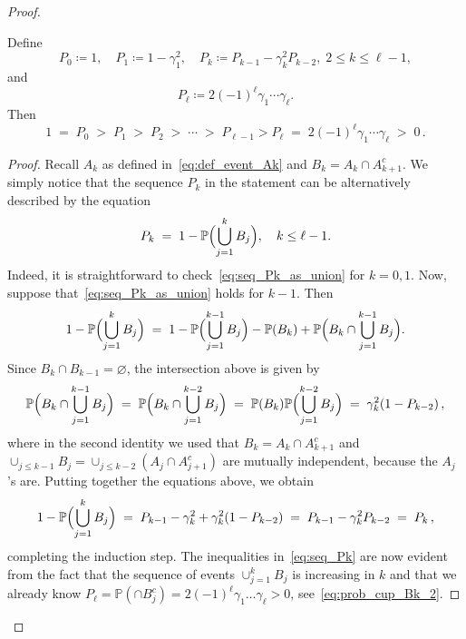 \documentclass[10pt,a4paper]{amsart}
\newcommand{\bb}[1]{{\mathbb #1}}
\begin{document}
\begin{proof}
\begin{lemma}
\label{lema:seq_Pk}
Define 
$$P_0 \coloneqq 1,\quad  P_1\coloneqq 1 - \gamma^2_1,\quad  P_k \coloneqq P_{k-1} - \gamma_k^2
P_{k-2}, \; 2\leq k\leq \ell-1,$$
%
and
%
$$P_\ell\coloneqq 2(-1)^\ell \gamma_1\cdots \gamma_\ell.
$$ 
%
Then
\begin{equation}
\label{eq:seq_Pk}
1    \;=\; P_0 \;>\; P_1 \;>\; P_2 \;>\; \cdots \;>\; P_{\ell-1} > P_{\ell}
    \;=\; 2(-1)^{\ell} \gamma_1 \cdots \gamma_\ell
    \;>\;0\,.
\end{equation}
\end{lemma}

\begin{proof}
Recall $A_k$ as defined in~\eqref{eq:def_event_Ak} and $B_k = A_k \cap
A_{k+1}^c$. We simply notice that the sequence $P_k$ in the statement can be
alternatively described by the equation
\begin{equation}\label{eq:seq_Pk_as_union}
    P_k \;=\; 1 - \bb P \Bigl(\bigcup_{j=1}^k B_j\Bigr),\quad k\leq \ell-1.
\end{equation}
Indeed, it is straightforward to check~\eqref{eq:seq_Pk_as_union} for $k=0,1$.
Now, suppose that~\eqref{eq:seq_Pk_as_union} holds for $k-1$. Then
\begin{align*}
1 - \bb P\Bigl( \bigcup_{j=1}^k B_j\Bigr)
    \;=\; 1 - \bb P\Bigl( \bigcup_{j=1}^{k-1} B_j\Bigr) - \bb P (B_k)
    + \bb P\Bigl( B_k \cap \bigcup_{j=1}^{k-1} B_j\Bigr).
\end{align*}
Since $B_k \cap B_{k-1} = \varnothing$, the intersection above is given by
\begin{equation*}
\bb P\Bigl( B_k \cap \bigcup_{j=1}^{k-1} B_j\Bigr)
\;=\; \bb P\Bigl( B_k \cap \bigcup_{j=1}^{k-2} B_j\Bigr)
    \;=\; \bb P(B_k) \bb P\Bigl(\bigcup_{j=1}^{k-2} B_j\Bigr)
    \;=\; \gamma_k^2 (1 - P_{k-2})\,,
\end{equation*}
%
where in the second identity we used that $B_k=A_k\cap A_{k+1}^c$ and $\cup_{j\leq k-1} B_j=\cup_{j\leq k-2}(A_j\cap A_{j+1}^c)$ are mutually independent, because the $A_j$'s are.
Putting together the equations above, we obtain
\begin{equation*}
1 - \bb P\Bigl( \bigcup_{j=1}^kB_j\Bigr)
    \;=\; P_{k-1} - \gamma_k^2 + \gamma_k^2 (1-P_{k-2})
    \;=\; P_{k-1} - \gamma_k^2 P_{k-2}
    \;=\; P_k\,,
\end{equation*}
completing the induction step.
The inequalities in~\eqref{eq:seq_Pk} are now evident from the fact that
the sequence of events $\cup_{j=1}^k B_j$ is increasing in $k$ and that
we already know $P_{\ell} = \bb P(\cap B_j^c) = 2 (-1)^{\ell} \gamma_1 \dots
    \gamma_{\ell} > 0$, see~\eqref{eq:prob_cup_Bk_2}.
\end{proof}


\end{proof}
\end{document}
